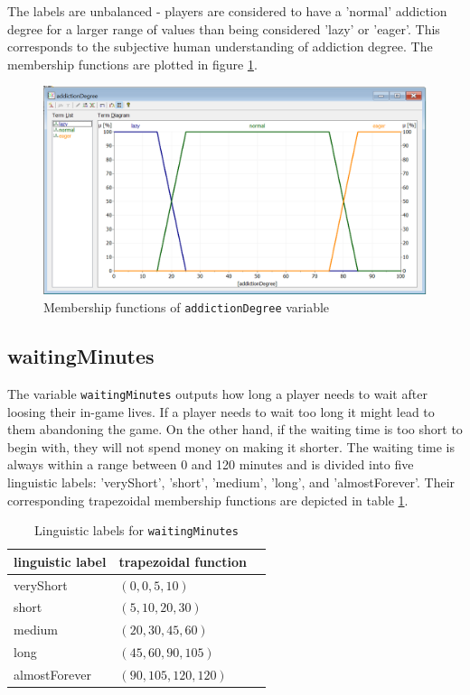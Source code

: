 The labels are unbalanced - players are considered to have a 'normal' addiction degree for a larger range of values than being considered 'lazy' or 'eager'. This corresponds to the subjective human understanding of addiction degree. The membership functions are plotted in figure \ref{fig:addictionDegree}.

\begin{figure}[H]
\centering
\includegraphics[width=\textwidth]{img/vAddictionDegree}
\caption{Membership functions of \texttt{addictionDegree} variable}
\label{fig:addictionDegree} 
\end{figure}

\subsection{waitingMinutes}

The variable \texttt{waitingMinutes} outputs how long a player needs to wait after loosing their in-game lives. If a player needs to wait too long it might lead to them abandoning the game. On the other hand, if the waiting time is too short to begin with, they will not spend money on making it shorter. The waiting time is always within a range between 0 and 120 minutes and is divided into five linguistic labels: 'veryShort', 'short', 'medium', 'long', and 'almostForever'. Their corresponding trapezoidal membership functions are depicted in table \ref{tab:waitingMinutes}.

\begin{table}[H]
\centering
\begin{tabular}{@{}lll@{}}
\toprule
\textbf{linguistic label}  & \textbf{trapezoidal function} \\ 
\midrule
veryShort  & $(0,0,5,10)$ \\
short & $(5,10,20,30)$ \\
medium & $(20,30,45,60)$ \\
long & $(45,60,90,105)$ \\
almostForever & $(90,105,120,120)$ \\
\bottomrule
\end{tabular}
\caption{Linguistic labels for \texttt{waitingMinutes}}
\label{tab:waitingMinutes}
\end{table}

